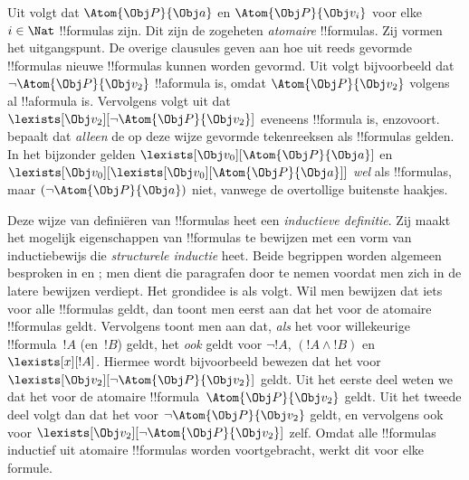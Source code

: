 \documentclass[../../../include/open-logic-section]{subfiles}
\begin{document}
Uit  volgt dat $\Atom{\Obj P}{\Obj a}$ en
$\Atom{\Obj P}{\Obj v_i}$ voor elke $i \in \Nat$ !!{formula}s zijn.
Dit zijn de zogeheten \emph{atomaire} !!{formula}s. Zij vormen het
uitgangspunt. De overige clausules geven aan hoe uit reeds gevormde
!!{formula}s nieuwe !!{formula}s kunnen worden gevormd. Uit
 volgt bijvoorbeeld dat $\lnot \Atom{\Obj P}{\Obj v_2}$
!!a{formula} is, omdat $\Atom{\Obj P}{\Obj v_2}$ volgens
 al !!a{formula} is. Vervolgens volgt uit
 dat $\lexists[\Obj v_2][\lnot \Atom{\Obj P}{\Obj
v_2}]$ eveneens !!{formula} is, enzovoort.  bepaalt
dat \emph{alleen} de op deze wijze gevormde tekenreeksen als
!!{formula}s gelden. In het bijzonder gelden $\lexists[\Obj
v_0][\Atom{\Obj P}{\Obj a}]$ en $\lexists[\Obj v_0][\lexists[\Obj
v_0][\Atom{\Obj P}{\Obj a}]]$ \emph{wel} als !!{formula}s, maar
$(\lnot \Atom{\Obj P}{\Obj a})$ niet, vanwege de overtollige buitenste
haakjes.

Deze wijze van definiëren van !!{formula}s heet een \emph{inductieve
definitie}. Zij maakt het mogelijk eigenschappen van !!{formula}s te
bewijzen met een vorm van inductiebewijs die \emph{structurele inductie}
heet. Beide begrippen worden algemeen besproken in
 en ; men dient die
paragrafen door te nemen voordat men zich in de latere bewijzen
verdiept. Het grondidee is als volgt. Wil men bewijzen dat iets voor
alle !!{formula}s geldt, dan toont men eerst aan dat het voor de
atomaire !!{formula}s geldt. Vervolgens toont men aan dat, \emph{als}
het voor willekeurige !!{formula}~$!A$ (en~$!B$) geldt, het \emph{ook}
geldt voor $\lnot !A$, $(!A \land !B)$ en $\lexists[x][!A]$. Hiermee
wordt bijvoorbeeld bewezen dat het voor $\lexists[\Obj v_2][\lnot
\Atom{\Obj P}{\Obj v_2}]$ geldt. Uit het eerste deel weten we dat het
voor de atomaire !!{formula}~$\Atom{\Obj P}{\Obj v_2}$ geldt. Uit het
tweede deel volgt dan dat het voor $\lnot \Atom{\Obj P}{\Obj v_2}$
geldt, en vervolgens ook voor $\lexists[\Obj v_2][\lnot \Atom{\Obj
P}{\Obj v_2}]$ zelf. Omdat alle !!{formula}s inductief uit atomaire
!!{formula}s worden voortgebracht, werkt dit voor elke formule.
\end{document}
